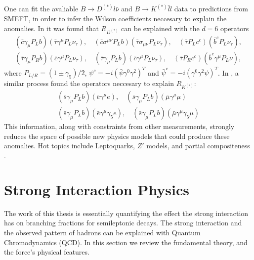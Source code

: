 One can fit the avaliable $B\to D^{(*)}l\bar{\nu}$ and $B\to K^{(*)}\bar{l}l$ data to predictions from SMEFT, in order to infer the Wilson coefficients neccesary to explain the anomalies. In \cite{Freytsis:2015qca} it was found that $R_{D^{(*)}}$ can be explained with the $d=6$ operators
\begin{gather}
  \nonumber
  (\bar{c}\gamma_{\mu}P_L b)(\bar{\tau}\gamma^{\mu} P_L \nu_{\tau}), \quad
  (\bar{c}\sigma^{\mu\nu} P_L b)(\bar{\tau} \sigma_{\mu\nu} P_L \nu_{\tau}), \quad
  (\bar{\tau} P_L c^c)(\bar{b}^c P_L \nu_{\tau}), \\
  (\bar{\tau}\gamma_{\mu} P_R b) (\bar{c} \gamma^{\mu} P_L \nu_{\tau}), \quad
  (\bar{\tau}\gamma_{\mu}P_L b)(\bar{c}\gamma^{\mu} P_L \nu_{\tau}), \quad
  (\bar{\tau}P_R c^c)(\bar{b}^c \gamma^{\mu} P_L \nu),
\end{gather}
where $P_{L/R} = (1\pm \gamma_5)/2$, $\psi^c = -i(\bar{\psi}\gamma^0\gamma^2)^T$ and $\bar{\psi}^c = -i(\gamma^0\gamma^2 \psi)^T$. In \cite{Altmannshofer:2017yso}, a similar process found the operators neccesary to explain $R_{K^{(*)}}$:
\begin{gather}
  \nonumber
  (\bar{s}\gamma_{\mu}P_L b)(\bar{e}\gamma^{\mu}e), \quad (\bar{s}\gamma_{\mu}P_L b)(\bar{\mu}\gamma^{\mu}\mu) \\
  (\bar{s}\gamma_{\mu}P_L b)(\bar{e}\gamma^{\mu}\gamma_5e), \quad (\bar{s}\gamma_{\mu}P_L b)(\bar{\mu}\gamma^{\mu}\gamma_5\mu)
\end{gather}
This information, along with constraints from other measurements, strongly reduces the space of possible new physics models that could produce these anomalies. Hot topics include Leptoquarks, $Z'$ models, and partial compositeness \cite{Altmannshofer:2017yso,Freytsis:2015qca,Bauer:2015knc,Crivellin:2015mga}.




\section{Strong Interaction Physics}
\label{sec:stronginteractions}

The work of this thesis is essentially quantifying the effect the strong interaction has on branching fractions for semileptonic decays. The strong interaction and the observed pattern of hadrons can be explained with Quantum Chromodynamics (QCD). In this section we review the fundamental theory, and the force's physical features.

